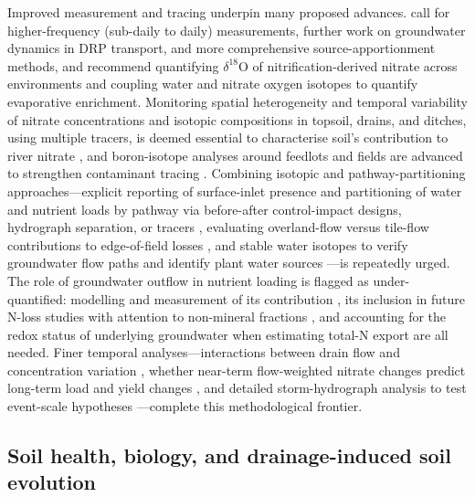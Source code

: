 Improved measurement and tracing underpin many proposed advances. \textcite{Williams2022} call for higher-frequency (sub-daily to daily) measurements, further work on groundwater dynamics in DRP transport, and more comprehensive source-apportionment methods, and \textcite{Hu2024} recommend quantifying $\delta^{18}$O of nitrification-derived nitrate across environments and coupling water and nitrate oxygen isotopes to quantify evaporative enrichment. Monitoring spatial heterogeneity and temporal variability of nitrate concentrations and isotopic compositions in topsoil, drains, and ditches, using multiple tracers, is deemed essential to characterise soil's contribution to river nitrate \parencite{Briand2017}, and boron-isotope analyses around feedlots and fields are advanced to strengthen contaminant tracing \parencite{Komor1997}. Combining isotopic and pathway-partitioning approaches---explicit reporting of surface-inlet presence and partitioning of water and nutrient loads by pathway via before-after control-impact designs, hydrograph separation, or tracers \parencite{Flores2021}, evaluating overland-flow versus tile-flow contributions to edge-of-field losses \parencite{Kokulan2019}, and stable water isotopes to verify groundwater flow paths and identify plant water sources \parencite{Islam2022,YliHalla2022}---is repeatedly urged. The role of groundwater outflow in nutrient loading is flagged as under-quantified: modelling and measurement of its contribution \parencite{Turunen2013}, its inclusion in future N-loss studies with attention to non-mineral fractions \parencite{Jokinen2024}, and accounting for the redox status of underlying groundwater when estimating total-N export \parencite{Barkle2021} are all needed. Finer temporal analyses---interactions between drain flow and concentration variation \parencite{Lagzdins2015}, whether near-term flow-weighted nitrate changes predict long-term load and yield changes \parencite{Danalatos2022}, and detailed storm-hydrograph analysis to test event-scale hypotheses \parencite{Kladivko2004}---complete this methodological frontier.

\subsection{Soil health, biology, and drainage-induced soil evolution}

